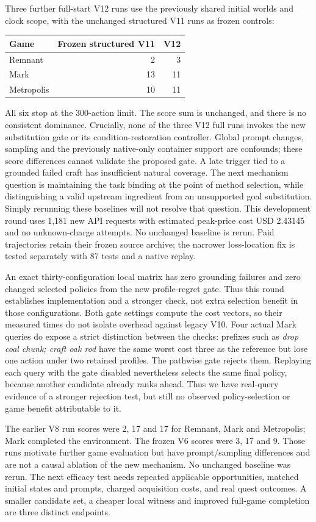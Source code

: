 \documentclass[11pt]{article}
\theoremstyle{definition}
\begin{document}
Three further full-start V12 runs use the previously shared initial worlds and
clock scope, with the unchanged structured V11 runs as frozen controls:
\begin{center}
\begin{tabular}{lrr}
Game & Frozen structured V11 & V12\\
\hline
Remnant & 2 & 3\\
Mark & 13 & 11\\
Metropolis & 10 & 11
\end{tabular}
\end{center}
All six stop at the 300-action limit. The score sum is unchanged, and there is
no consistent dominance. Crucially, none of the three V12 full runs invokes the
new substitution gate or its condition-restoration controller. Global prompt
changes, sampling and the previously native-only container support are
confounds; these score differences cannot validate the proposed gate. A late
trigger tied to a grounded failed craft has insufficient natural coverage.
The next mechanism question is maintaining the task binding at the point of
method selection, while distinguishing a valid upstream ingredient from an
unsupported goal substitution. Simply rerunning these baselines will not resolve
that question. This development round uses 1,181 new API requests with estimated
peak-price cost USD 2.43145 and no unknown-charge attempts. No unchanged baseline
is rerun. Paid trajectories retain their frozen source archive; the narrower
loss-location fix is tested separately with 87 tests and a native replay.

An exact thirty-configuration local matrix has zero grounding failures and
zero changed selected policies from the new profile-regret gate. Thus this
round establishes implementation and a stronger check, not extra selection
benefit in those configurations. Both gate settings compute the cost vectors,
so their measured times do not isolate overhead against legacy V10.
Four actual Mark queries do expose a strict distinction between the checks:
prefixes such as \emph{drop coal chunk; craft oak rod} have the same worst
cost three as the reference but lose one action under two retained profiles.
The pathwise gate rejects them. Replaying each query with the gate disabled
nevertheless selects the same final policy, because another candidate already
ranks ahead. Thus we have real-query evidence of a stronger rejection test,
but still no observed policy-selection or game benefit attributable to it.

The earlier V8 run scores were 2, 17 and 17 for Remnant, Mark and Metropolis;
Mark completed the environment. The frozen V6 scores were 3, 17 and 9. Those
runs motivate further game evaluation but have prompt/sampling differences and
are not a causal ablation of the new mechanism. No unchanged baseline was rerun.
The next efficacy test needs repeated applicable opportunities, matched initial
states and prompts, charged acquisition costs, and real quest outcomes. A smaller
candidate set, a cheaper local witness and improved full-game completion are
three distinct endpoints.
\end{document}
